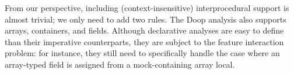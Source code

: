 From our perspective, including (context-insensitive) interprocedural support is almost trivial; we only need to add two rules. The Doop analysis also supports arrays, containers, and fields. Although declarative analyses are easy to define than their imperative counterparts, they are subject to the feature interaction problem: for instance, they still need to specifically handle the case where an array-typed field is assigned from a mock-containing array local.





